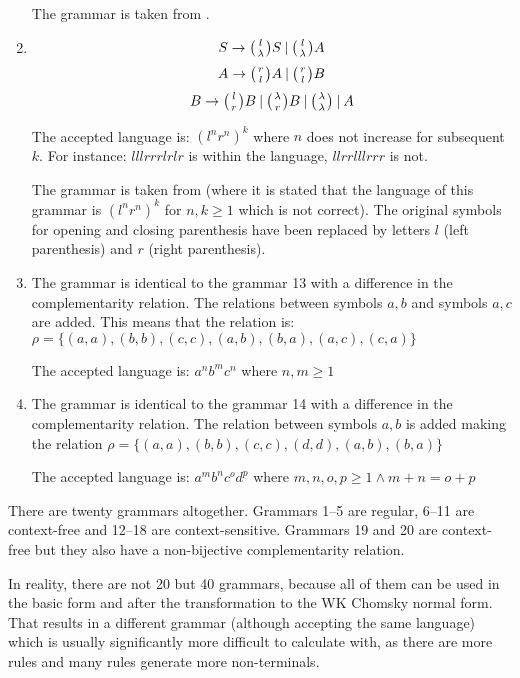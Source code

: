 \begin{enumerate}
{    The grammar is taken from \cite{WK_CYK}.
  }

  \item{
    $$S \rightarrow \wkpair{l}{\lambda} S \:|\: \wkpair{l}{\lambda} A$$
    $$A \rightarrow \wkpair{r}{l} A \:|\: \wkpair{r}{l} B$$
    $$B \rightarrow \wkpair{l}{r} B \:|\: \wkpair{\lambda}{r} B \:|\: \wkpair{\lambda}{\lambda} \:|\: A$$

    The accepted language is: $(l^n r^n)^k$ where $n$ does not increase for subsequent $k$. For instance: $lllrrrlrlr$ is within the language, $llrrlllrrr$ is not.

    The grammar is taken from \cite{WK_GRAMMARS_1} (where it is stated that the language of this grammar is $(l^nr^n)^k$ for $n, k \geq 1$ which is not correct). The original symbols for opening and closing parenthesis have been replaced by letters $l$ (left parenthesis) and $r$ (right parenthesis).
  }

  \item{
    The grammar is identical to the grammar 13 with a difference in the complementarity relation. The relations between symbols $a, b$ and symbols $a, c$ are added. This means that the relation is: $\rho = \{(a, a), (b, b), (c, c), (a, b), (b, a), (a, c), (c, a)\}$

    The accepted language is: $a^n b^m c^n$ where $n, m \geq 1$
  }

  \item{
	The grammar is identical to the grammar 14 with a difference in the complementarity relation. The relation between symbols $a, b$ is added making the relation $\rho = \{(a, a), (b, b), (c, c), (d, d), (a, b), (b, a)\}$

	The accepted language is: $a^m b^n c^o d^p$ where $m, n, o, p \geq 1 \wedge m+n = o+p$
  }


\end{enumerate}

There are twenty grammars altogether. Grammars 1--5 are regular, 6--11 are context-free and 12--18 are context-sensitive. Grammars 19 and 20 are context-free but they also have a non-bijective complementarity relation.

In reality, there are not 20 but 40 grammars, because all of them can be used in the basic form and after the transformation to the WK Chomsky normal form. That results in a different grammar (although accepting the same language) which is usually significantly more difficult to calculate with, as there are more rules and many rules generate more non-terminals.

